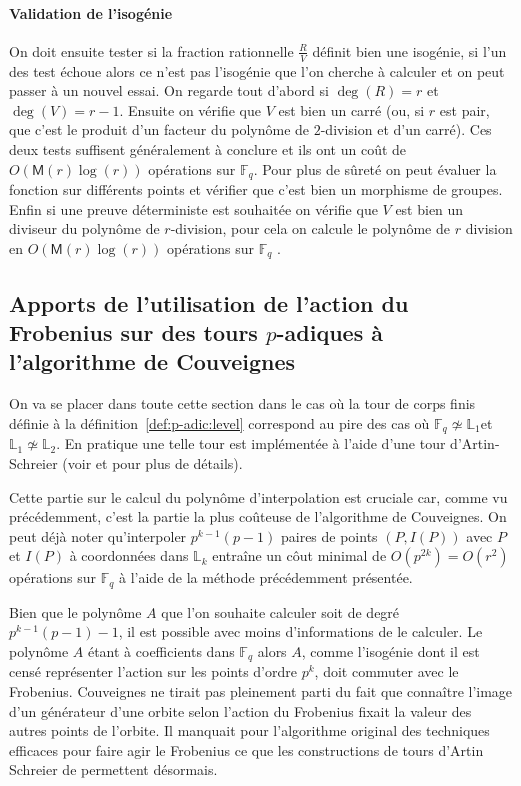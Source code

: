 \documentclass[10pt,a4paper]{book}
\theoremstyle{plain}
\theoremstyle{definition}
\theoremstyle{definition}
\theoremstyle{definition}
\theoremstyle{definition}
\theoremstyle{remark}
\theoremstyle{remark}
\theoremstyle{definition}
\begin{document}
\paragraph{Validation de l'isogénie} \label{par:val:iso}
 On doit ensuite tester si la fraction rationnelle $\frac{R}{V}$ définit bien une isogénie, si l'un des test échoue alors ce n'est pas l'isogénie que l'on cherche à calculer et on peut passer à un nouvel essai. On regarde tout d'abord si $\deg(R)=r$ et $\deg(V)=r-1$. Ensuite on vérifie que $V$ est bien un carré (ou, si $r$ est pair, que c'est le produit d'un facteur du polynôme de $2$-division et d'un carré). Ces deux tests suffisent généralement à conclure et ils ont un coût de $O(\mathsf{M}(r) \log(r))$ opérations sur $\mathbb{F}_q$. Pour plus de sûreté on peut évaluer la fonction sur différents points et vérifier que c'est bien un morphisme de groupes. Enfin si une preuve déterministe est souhaitée on vérifie que $V$ est bien un diviseur du polynôme de $r$-division, pour cela on calcule le polynôme de $r$ division en $O(\mathsf{M}(r)\log(r))$ opérations sur $\mathbb{F}_q$ . 


\subsection{Apports de l'utilisation de l'action du Frobenius sur des tours $p$-adiques à l'algorithme de Couveignes}
\label{sub:fro:int}
On va se placer dans toute cette section dans le cas où la tour de corps
finis définie à la définition~\ref{def:p-adic:level} correspond au pire des cas où
$\mathbb{F}_q \not \simeq \mathbb{L}_1$et $\mathbb{L}_1 \not \simeq 
\mathbb{L}_2$. En pratique une telle tour est implémentée à l'aide d'une tour 
d'Artin-Schreier (voir \cite{DeFeo11} et \cite{DeFeo-Shost'12} pour plus de 
détails).

Cette partie sur le calcul du polynôme d'interpolation est cruciale car, comme vu précédemment, c'est la partie la plus coûteuse de l'algorithme de Couveignes. On peut déjà noter qu'interpoler $p^{k-1}(p-1)$ paires de points $(P,I(P))$ avec $P$ et $I(P)$ à coordonnées dans $\mathbb{L}_k$ entraîne un côut minimal de $O(p^{2k})=O(r^2)$ opérations sur $\mathbb{F}_q$ à l'aide de la méthode précédemment présentée. 

Bien que le polynôme $A$ que l'on souhaite calculer soit de degré $p^{k-1}
(p-1)-1$, il est possible avec moins d'informations de le calculer. Le polynôme
$A$ étant à coefficients dans $\mathbb{F}_q$ alors $A$, comme l'isogénie dont 
il est censé représenter l'action sur les points d'ordre $p^k$, doit commuter 
avec le Frobenius. Couveignes \cite{Couveignes96} ne tirait pas 
pleinement parti du fait que connaître l'image d'un générateur d'une orbite 
selon l'action du Frobenius fixait la valeur des autres points de l'orbite. 
Il manquait pour l'algorithme original des techniques efficaces pour faire agir
le Frobenius ce que les constructions de tours d'Artin Schreier de 
\cite{DeFeo-Shost'12} permettent désormais.
\end{document}
